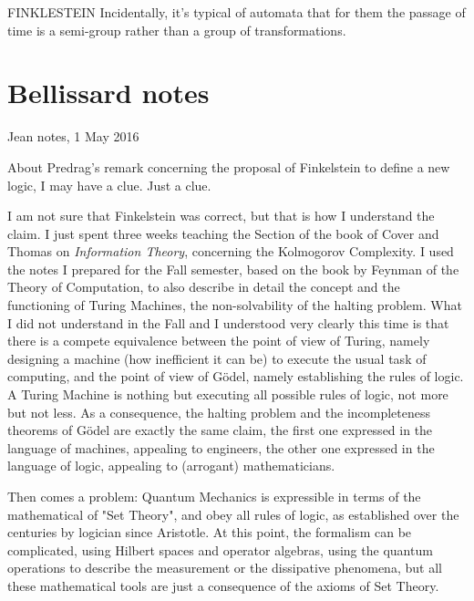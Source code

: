 FINKLESTEIN Incidentally, it's typical of automata that for them the passage of
time is a semi-group rather than a group of transformations.


\newpage
\section{Bellissard notes}
\label{sect:Bellissard}

Jean notes, 1 May 2016

About Predrag's remark concerning the proposal of Finkelstein to define a
new logic, I may have a clue. Just a clue.

I am not sure that Finkelstein was correct, but that is how I understand
the claim. I just spent three weeks teaching the Section of the book of
Cover and Thomas on {\em Information Theory}, concerning the Kolmogorov
Complexity. I used the notes I prepared for the Fall semester, based on
the book by Feynman of the Theory of Computation, to also describe in
detail the concept and the functioning of Turing Machines, the
non-solvability of the halting problem. What I did not understand in the
Fall and I understood very clearly this time is that there is a compete
equivalence between the point of view of Turing, namely designing a
machine (how inefficient it can be) to execute the usual task of
computing, and the point of view of G\"odel, namely establishing the
rules of logic. A Turing Machine is nothing but executing all possible
rules of logic, not more but not less. As a consequence, the halting
problem and the incompleteness theorems of G\"odel are exactly the same
claim, the first one expressed in the language of machines, appealing to
engineers, the other one expressed in the language of logic, appealing to
(arrogant) mathematicians.


    Then comes a problem: Quantum Mechanics is expressible in terms of the
    mathematical of "Set Theory", and obey all rules of logic, as established
    over the centuries by logician since Aristotle. At this point, the formalism
    can be complicated, using Hilbert spaces and operator algebras, using the
    quantum operations to describe the measurement or the dissipative phenomena,
    but all these mathematical tools are just a consequence of the axioms of Set
    Theory.


